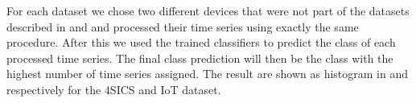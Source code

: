 For each dataset we chose two different devices that were not part of the datasets described in  and  and processed their time series using exactly the same procedure. After this we used the trained classifiers to predict the class of each processed time series. The final class prediction will then be the class with the highest number of time series assigned. The result are shown as histogram in  and  respectively for the 4SICS and IoT dataset. 



\begin{figure}[h]
    \centering
    \begin{minipage}[c]{0.49\linewidth}
        \vspace{0pt}
        \centering
    \end{minipage}%
    \hfill%
    \begin{minipage}[c]{0.49\linewidth}
        \vspace{0pt}
        \centering
\end{minipage}
\end{figure}
